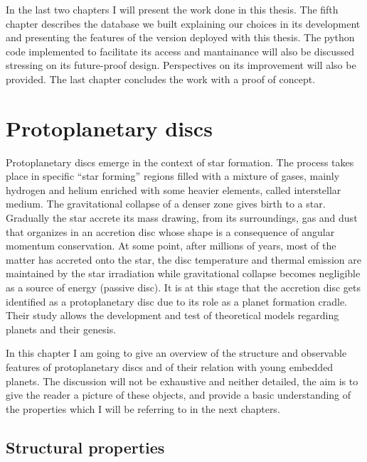 \documentclass[a4paper,10pt]{report}
\begin{document}
In the last two chapters I will present the work done in this thesis. The fifth chapter describes the database we built
explaining our choices in its development and presenting the features of the version deployed with this thesis.
The python code implemented to facilitate its access and mantainance will also be discussed stressing on its future-proof design.
Perspectives on its improvement will also be provided.
The last chapter concludes the work with a proof of concept.

\chapter{Protoplanetary discs}

Protoplanetary discs emerge in the context of star formation. 
The process takes place in specific ``star forming'' regions filled with a mixture of gases, mainly hydrogen and helium enriched with some
heavier elements, called interstellar medium. The gravitational collapse of a denser zone gives birth to a star. Gradually the star
accrete its mass drawing, from its surroundings, gas and dust that organizes in an accretion disc whose shape is a consequence of angular momentum conservation.
At some point, after millions of years, most of the matter has accreted onto the star,
the disc temperature and thermal emission are maintained by the star irradiation while gravitational collapse becomes negligible as a source of energy (passive disc). 
It is at this stage that the accretion disc gets identified
as a protoplanetary disc due to its role as a planet formation cradle.
Their study allows the development and test of theoretical models regarding planets and their genesis.

In this chapter I am going to give an overview of the structure and observable features
of protoplanetary discs and of their relation with young embedded planets. The discussion will not be
exhaustive and neither detailed, the aim is to give
the reader a picture of these objects, and provide a basic understanding of the 
properties which I will be referring to in the next chapters.

\section{Structural properties}
\end{document}
